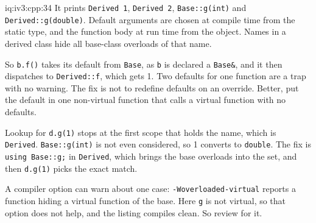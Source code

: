 \begin{solution}{iq:iv3:cpp:34}
It prints \texttt{Derived 1}, \texttt{Derived 2}, \texttt{Base::g(int)} and \texttt{Derived::g(double)}. Default arguments are chosen at compile time from the static type, and the function body at run time from the object. Names in a derived class hide all base-class overloads of that name.

So \texttt{b.f()} takes its default from \texttt{Base}, as \texttt{b} is declared a \texttt{Base\&}, and it then dispatches to \texttt{Derived::f}, which gets 1. Two defaults for one function are a trap with no warning. The fix is not to redefine defaults on an override. Better, put the default in one non-virtual function that calls a virtual function with no defaults.

Lookup for \texttt{d.g(1)} stops at the first scope that holds the name, which is \texttt{Derived}. \texttt{Base::g(int)} is not even considered, so 1 converts to \texttt{double}. The fix is \texttt{using Base::g;} in \texttt{Derived}, which brings the base overloads into the set, and then \texttt{d.g(1)} picks the exact match.

A compiler option can warn about one case: \texttt{-Woverloaded-virtual} reports a function hiding a virtual function of the base. Here \texttt{g} is not virtual, so that option does not help, and the listing compiles clean. So review for it.

\end{solution}

